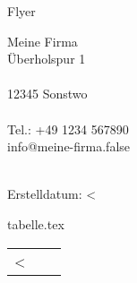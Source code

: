 \documentclass[a4paper,foldmarks=true]{scrartcl}
\newcommand\Zeile[5]{%
     \multirow{3}{25mm}{ \begin{picture}(30,40)(0,-12) \texttt{[image: \#1]} \end{picture} }& 
     \multicolumn{2}{p{115mm}}{\textbf #4}  \\
     \nopagebreak & \multicolumn{2}{p{115mm}}{\small #5}  \\
     \nopagebreak & \small #2 & \multicolumn{1}{r}{\textbf #3 €}   
     \\ 
}
\begin{document}
\fontsize{12}{15pt plus 0.15pt minus 0.1pt}\selectfont

\centering
\LARGE Flyer \\
\vspace{3cm}
\parbox{14cm}{
Meine Firma \\
Überholspur 1\\
\\
12345 Sonstwo\\
\\
Tel.: +49 1234 567890\\
info@meine-firma.false\\
}
\\
\vspace{1cm}
Erstelldatum: <%


\begin{filecontents}{tabelle.tex}

\begin{longtable}{@{}p{30mm}p{55mm}p{55mm}@{}} %

    \endfirsthead

    \endhead

  \endfoot

  \endlastfoot

	<%
            \ifthenelse{\equal{<%
            { \Zeile{<%
	<%

	\hline
\end{longtable}
\end{filecontents}
\end{document}
